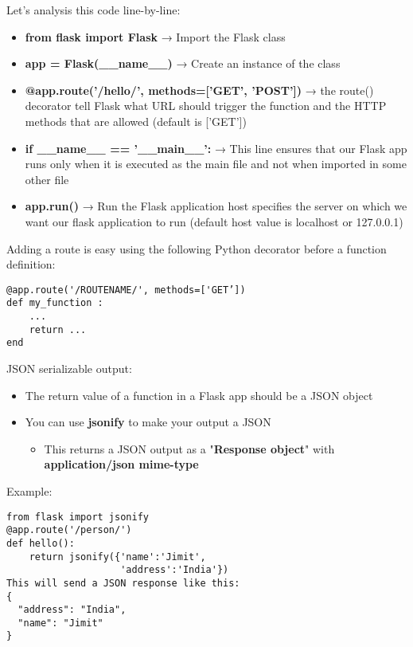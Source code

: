 \documentclass{beamer}[10pt, usepdftitle=false handout]
\begin{document}
\begin{frame}[fragile]
Let's analysis this code line-by-line:
\vspace*{0.6em}

\begin{itemize}
\item{\textbf{from flask import Flask} → Import the Flask class}
\item{\textbf{app = Flask(\_\_name\_\_)} → Create an instance of the class}
\item{\textbf{@app.route('/hello/', methods=['GET', 'POST'])} → the route() decorator tell Flask what URL should trigger the function 
and the HTTP methods that are allowed (default is ['GET'])}
\item{\textbf{if \_\_name\_\_ == '\_\_main\_\_':} → This line ensures that our Flask app runs only when it is executed as the main file and not when imported in some other file}
\item{\textbf{app.run()} → Run the Flask application
host specifies the server on which we want our flask application to run (default host value is localhost or 127.0.0.1)}
\end{itemize}

\end{frame}
\begin{frame}[fragile]
Adding a route is easy using the following Python decorator before a function definition:
\vspace*{0.6em}

\begin{verbatim}
@app.route('/ROUTENAME/', methods=['GET’])
def my_function :
    ...
    return ...
end
\end{verbatim}
\vspace*{0.6em}

\end{frame}
\begin{frame}[fragile]
JSON serializable output:
\vspace*{0.6em}

\begin{itemize}
\item{The return value of a function in a Flask app should be a JSON object}
\item{You can use \textbf{jsonify} to make your output a JSON
	\begin{itemize}
		\item{This returns a JSON output as a "\textbf{Response object}" with \textbf{application/json mime-type}}
	\end{itemize}
}
\end{itemize}
\vspace*{0.6em}

Example:
\vspace*{0.6em}

\begin{verbatim}
from flask import jsonify
@app.route('/person/')
def hello():
    return jsonify({'name':'Jimit',
                    'address':'India'})
This will send a JSON response like this:
{
  "address": "India", 
  "name": "Jimit"
}
\end{verbatim}


\end{frame}
\end{document}
